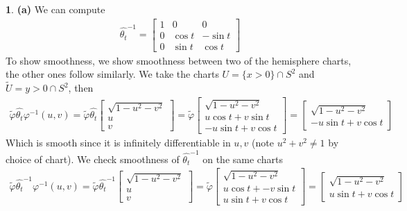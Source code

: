 \documentclass[10.5pt]{article}
\theoremstyle{definition}
\newtheorem{pb}{}
\newcommand{\set}[1]{\{#1\}}
\begin{document}
    \begin{pb}
        \textbf{(a)}
        We can compute
        \begin{align*}
            \hat{\theta_t}^{-1} = \begin{bmatrix} 1 & 0 & 0 \\ 0 & \cos t & -\sin t \\ 0 & \sin t & \cos t \end{bmatrix}
        \end{align*}
        To show smoothness, we show smoothness between two of the hemisphere charts, the other ones follow similarly. We take the charts \(U = \set{x > 0} \cap S^2\) and \(\tilde{U} = {y > 0}\cap S^2\), then
        \begin{align*}
            \tilde{\varphi}\hat{\theta_t}\varphi^{-1}(u,v) = \tilde{\varphi}\hat{\theta_t} \begin{bmatrix}\sqrt{1-u^2-v^2}\\u\\v\end{bmatrix} 
            = \tilde{\varphi}\begin{bmatrix} \sqrt{1-u^2-v^2}\\ u\cos t + v\sin t \\ -u\sin t + v\cos t \end{bmatrix} = \begin{bmatrix} \sqrt{1-u^2-v^2} \\ -u\sin t + v\cos t \end{bmatrix}
        \end{align*}
        Which is smooth since it is infinitely differentiable in \(u,v\) (note \(u^2 + v^2 \neq 1\) by choice of chart). We check smoothness of \(\hat{\theta_t}^{-1}\) on the same charts
        \begin{align*}
            \tilde{\varphi}\hat{\theta_t}^{-1}\varphi^{-1}(u,v) = \tilde{\varphi}\hat{\theta_t}^{-1} \begin{bmatrix}\sqrt{1-u^2-v^2}\\u\\v\end{bmatrix} 
            = \tilde{\varphi}\begin{bmatrix} \sqrt{1-u^2-v^2}\\ u\cos t + -v\sin t \\ u\sin t + v\cos t \end{bmatrix} = \begin{bmatrix} \sqrt{1-u^2-v^2} \\ u\sin t + v\cos t \end{bmatrix}
        \end{align*}


\end{pb}
\end{document}
